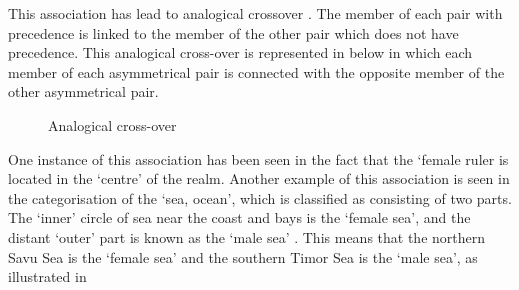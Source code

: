 This association has lead to analogical crossover \citep{fo89}.
The member of each pair with precedence
is linked to the member of the other pair which does not have precedence.
This analogical cross-over is represented in  below
in which each member of each asymmetrical pair is connected
with the opposite member of the other asymmetrical pair.

\begin{figure}[h]
\caption{Analogical cross-over}\label{fig:AnaCro}
	\begin{minipage}{.49\textwidth}
	\end{minipage}
	\begin{minipage}{.49\textwidth}
	\end{minipage}
\end{figure}

One instance of this association has been seen in the fact that the  `female ruler
is located in the  `centre' of the realm.
Another example of this association is seen in the categorisation
of the  `sea, ocean', which is classified as consisting of two parts.
The  `inner' circle of sea near the coast and bays
is the  `female sea', and the distant  `outer' part
is known as the  `male sea' \citep[50]{cu64}.
This means that the northern Savu Sea is the  `female sea'
and the southern Timor Sea is the  `male sea',
as illustrated in 

